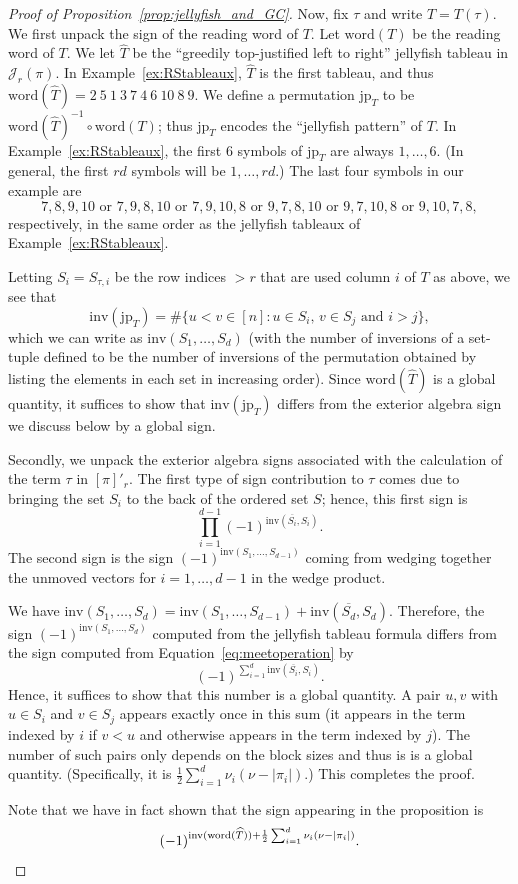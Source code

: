 \documentclass[ALCO, Unicode]{cedram}
\numberwithin{equation}{section}
\newcommand{\jp}{\mathrm{jp}}
\newcommand{\word}{\mathrm{word}}
\newcommand{\inv}{\mathrm{inv}}
\begin{document}
\begin{proof}[Proof of Proposition~\ref{prop:jellyfish_and_GC}]
Now, fix $\tau$ and write $T = T(\tau)$. We first unpack the sign of the reading word of $T$. Let $\word(T)$ be the reading word of $T$. We let $\widehat{T}$ be the ``greedily top-justified left to right'' jellyfish tableau in $\mathcal{J}_r(\pi)$. In Example~\ref{ex:RStableaux}, $\widehat{T}$ is the first tableau, and thus $\word(\widehat{T}) = 2\ 5\ 1\ 3\ 7\ 4\ 6\ 10\ 8\ 9$. We define a permutation $\jp_T$ to be $\word(\widehat{T})^{-1} \circ \word(T)$; thus $\jp_T$ encodes the ``jellyfish pattern'' of $T$. 
In Example~\ref{ex:RStableaux}, the first $6$ symbols of $\jp_T$ are always $1,\dots,6$. (In general, the first $rd$ symbols will be $1, \dots, rd$.)
The last four symbols in our example are 
\[7,8,9,10 \text{ or } 7,9,8,10 \text{ or } 7,9,10,8 \text{ or } 9,7,8,10 \text{ or } 9,7,10,8 \text{ or } 9,10,7,8,\]
respectively, in the same order as the jellyfish tableaux of Example~\ref{ex:RStableaux}. 


Letting $S_i = S_{\tau, i}$ be the row indices $>r$ that are used column $i$ of $T$ as above, we see that
\begin{equation}
\inv(\jp_T) = \# \{u<v \in [n] \colon u \in S_i, \, v \in S_j \text{ and } i>j \},
\end{equation}
which we can write as $\inv(S_1,\dots,S_d)$ (with the number of inversions of a set-tuple defined to be the number of inversions of the permutation obtained by listing the elements in each set in increasing order). Since $\word(\widehat{T})$ is a global quantity, it suffices to show that $\inv(\jp_T)$ differs from the exterior algebra sign we discuss below by a global sign. 

Secondly, we unpack the exterior algebra signs associated with the calculation of the term $\tau$ in $[\pi]'_r$. The first type of sign contribution to $\tau$ comes due to bringing the set $S_i$ to the back of the ordered set $S$; hence, this  first sign is \[
\prod_{i=1}^{d-1} (-1)^{\inv(\overline{S_i},S_i)}.
\]
The second sign is the sign  $(-1)^{\inv(S_1,\dots,S_{d-1})}$ coming from wedging together the unmoved vectors for $i=1,\dots,d-1$ in the wedge product. 

We have $\inv(S_1,\dots,S_{d}) = \inv(S_1,\dots,S_{d-1})+\inv(\overline{S_d}, S_{d})$. 
Therefore, the sign $(-1)^{\inv(S_1,\dots,S_{d})}$ computed from the jellyfish tableau formula differs from the sign computed from Equation~\eqref{eq:meetoperation} by
\[
(-1)^{\sum_{i=1}^d \inv(\overline{S_i}, S_{i})}.
\]
Hence, it suffices to show that this number is a global quantity. A pair $u,v$ with $u \in S_i$ and $v \in S_j$ appears exactly once in this sum (it appears in the term indexed by $i$ if $v<u$ and otherwise appears in the term indexed by $j$). The number of such pairs only depends on the block sizes and thus is is a global quantity. (Specifically, it is $\frac{1}{2} \sum_{i=1}^d \nu_i(\nu-|\pi_i|)$.) This completes the proof.

Note that we have in fact shown that the sign appearing in the proposition is \[(-1)^{\inv(\word(\widehat{T})) + \frac{1}{2} \sum_{i=1}^d \nu_i(\nu-|\pi_i|) }. \qedhere\]
\end{proof}
\end{document}
